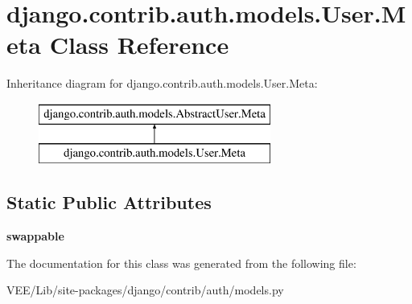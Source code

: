 \hypertarget{classdjango_1_1contrib_1_1auth_1_1models_1_1_user_1_1_meta}{}\section{django.\+contrib.\+auth.\+models.\+User.\+Meta Class Reference}
\label{classdjango_1_1contrib_1_1auth_1_1models_1_1_user_1_1_meta}
Inheritance diagram for django.\+contrib.\+auth.\+models.\+User.\+Meta\+:\begin{figure}[H]
\begin{center}
\leavevmode
\includegraphics[height=2.000000cm]{classdjango_1_1contrib_1_1auth_1_1models_1_1_user_1_1_meta}
\end{center}
\end{figure}
\subsection*{Static Public Attributes}
\begin{DoxyCompactItemize}
\item 
\mbox{\label{classdjango_1_1contrib_1_1auth_1_1models_1_1_user_1_1_meta_a09e61da6d44909ab6626645c31bd2274}} 
{\bfseries swappable}
\end{DoxyCompactItemize}


The documentation for this class was generated from the following file\+:\begin{DoxyCompactItemize}
\item 
V\+E\+E/\+Lib/site-\/packages/django/contrib/auth/models.\+py\end{DoxyCompactItemize}
